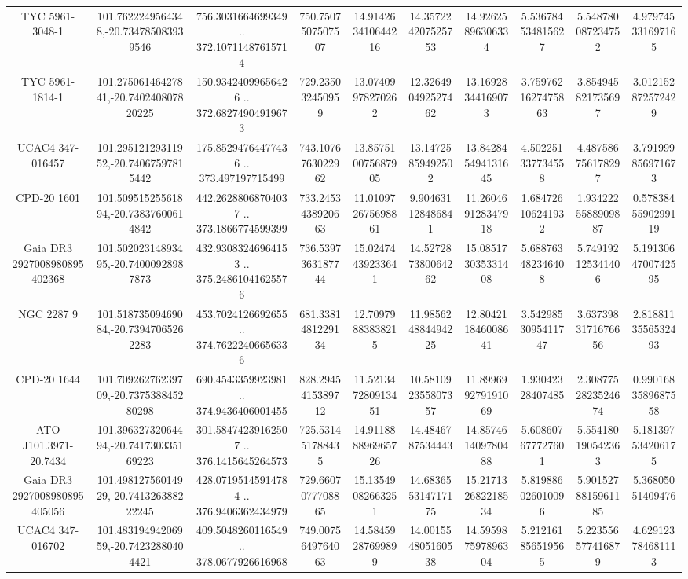 \begin{table}
\begin{tabular}{cccccccccc}
TYC 5961-3048-1 & 101.7622249564348,-20.734785083939546 & 756.3031664699349 .. 372.10711487615714 & 750.7507507507507 & 14.914263410644216 & 14.357224207525753 & 14.92625896306334 & 5.536784534815627 & 5.548780087234752 & 4.979745331697165 \\
TYC 5961-1814-1 & 101.27506146427841,-20.740240807820225 & 150.93424099656426 .. 372.68274904919673 & 729.235032450959 & 13.07409978270262 & 12.326490492527462 & 13.16928344169073 & 3.7597621627475863 & 3.854945821735697 & 3.012152872572429 \\
UCAC4 347-016457 & 101.29512129311952,-20.74067597815442 & 175.85294764477436 .. 373.497197715499 & 743.1076763022962 & 13.857510075687905 & 13.14725859492502 & 13.842845494131645 & 4.502251337734558 & 4.487586756178297 & 3.791999856971673 \\
CPD-20  1601 & 101.50951525561894,-20.73837600614842 & 442.26288068704037 .. 373.1866774599399 & 733.2453438920663 & 11.010972675698861 & 9.904631128486841 & 11.260469128347918 & 1.684726106241932 & 1.9342225588909887 & 0.5783845590299119 \\
Gaia DR3 2927008980895402368 & 101.50202314893495,-20.74000928987873 & 432.93083246964153 .. 375.24861041625576 & 736.5397363187744 & 15.02474439233641 & 14.527287380064262 & 15.085173035331408 & 5.688763482346408 & 5.749192125341406 & 5.1913064700742595 \\
NGC  2287     9 & 101.51873509469084,-20.73947065262283 & 453.7024126692655 .. 374.76222406656336 & 681.3381481229134 & 12.70979883838215 & 11.985624884494225 & 12.804211846008641 & 3.5429853095411747 & 3.6373983171676656 & 2.8188113556532493 \\
CPD-20  1644 & 101.70926276239709,-20.737538845280298 & 690.4543359923981 .. 374.9436406001455 & 828.2945415389712 & 11.521347280913451 & 10.581092355807357 & 11.899699279191069 & 1.93042328407485 & 2.3087752823524674 & 0.9901683589687558 \\
ATO J101.3971-20.7434 & 101.39632732064494,-20.741730335169223 & 301.58474239162507 .. 376.1415645264573 & 725.531451788435 & 14.911888896965726 & 14.4846787534443 & 14.857461409780488 & 5.608607677727601 & 5.554180190542363 & 5.181397534206175 \\
Gaia DR3 2927008980895405056 & 101.49812756014929,-20.741326388222245 & 428.07195145914784 .. 376.9406362434979 & 729.6607077708865 & 15.13549082663251 & 14.683655314717175 & 15.217132682218534 & 5.819886026010096 & 5.9015278815961185 & 5.36805051409476 \\
UCAC4 347-016702 & 101.48319494206959,-20.74232880404421 & 409.5048260116549 .. 378.0677926616968 & 749.0075649764063 & 14.58459287699899 & 14.001554805160538 & 14.595987597896304 & 5.212161856519565 & 5.223556577416879 & 4.629123784681113 \\

\end{tabular}
\end{table}
